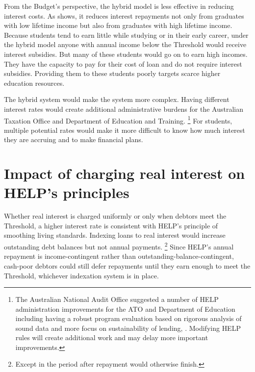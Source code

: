\documentclass{grattan}
\begin{document}
From the Budget's perspective, the hybrid model is less effective in reducing interest costs.
As  shows, it reduces interest repayments not only from graduates with low lifetime income but also from graduates with high lifetime income.
Because students tend to earn little while studying or in their early career, under the hybrid model anyone with annual income below the \gls{Threshold} would receive interest subsidies.
But many of these students would go on to earn high incomes.
They have the capacity to pay for their cost of loan and do not require interest subsidies.
Providing them to these students poorly targets scarce higher education resources.

The hybrid system would make the system more complex.
Having different interest rates would create additional administrative burdens for the Australian Taxation Office and Department of Education and Training.%
   \footnote{The Australian National Audit Office suggested a number of \gls{HELP} administration improvements for the \gls{ATO} and Department of Education including having a robust program evaluation based on rigorous analysis of sound data and more focus on sustainability of lending, \textcite[][7]{ANAO2016AdministrationHigherEducation}.
Modifying \gls{HELP} rules will create additional work and may delay more important improvements.} 
For students, multiple potential rates would make it more difficult to know how much interest they are accruing and to make financial plans.

\section[Impact of charging real interest on {HELP}'s principles]{Impact of charging real interest on \gls{HELP}'s principles} \label{how-would-the-real-interest-model-and-the-hybrid-model-affect-helps-principles}

Whether real interest is charged uniformly or only when debtors meet the \gls{Threshold}, a higher interest rate is consistent with \gls{HELP}'s principle of smoothing living standards.
Indexing loans to real interest would increase outstanding debt balances but not annual payments.%
   \footnote{Except in the period after repayment would otherwise finish.} 
Since \gls{HELP}'s annual repayment is income-contingent rather than outstanding-balance-contingent, cash-poor debtors could still defer repayments until they earn enough to meet the \gls{Threshold}, whichever indexation system is in place.
\end{document}
